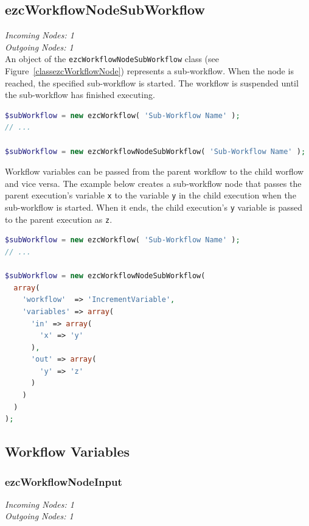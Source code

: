 \subsection{ezcWorkflowNodeSubWorkflow}

\emph{Incoming Nodes: 1}\\
\emph{Outgoing Nodes: 1}\\

An object of the \texttt{ezcWorkflowNodeSubWorkflow} class (see
Figure~\ref{classezcWorkflowNode}) represents a sub-workflow. When the node
is reached, the specified sub-workflow is started. The workflow is suspended
until the sub-workflow has finished executing.

\begin{lstlisting}[language=PHP]
$subWorkflow = new ezcWorkflow( 'Sub-Workflow Name' );
// ...

$subWorkflow = new ezcWorkflowNodeSubWorkflow( 'Sub-Workflow Name' );
\end{lstlisting}

Workflow variables can be passed from the parent workflow to the
child worflow and vice versa. The example below creates a sub-workflow
node that passes the parent execution's variable \texttt{x} to the variable
\texttt{y} in the child execution when the sub-workflow is started. When it
ends, the child execution's \texttt{y} variable is passed to the parent
execution as \texttt{z}.

\begin{lstlisting}[language=PHP]
$subWorkflow = new ezcWorkflow( 'Sub-Workflow Name' );
// ...

$subWorkflow = new ezcWorkflowNodeSubWorkflow(
  array(
    'workflow'  => 'IncrementVariable',
    'variables' => array(
      'in' => array(
        'x' => 'y'
      ),
      'out' => array(
        'y' => 'z'
      )
    )
  )
);
\end{lstlisting}

\subsection{Workflow Variables}

\subsubsection{ezcWorkflowNodeInput}

\emph{Incoming Nodes: 1}\\
\emph{Outgoing Nodes: 1}\\


